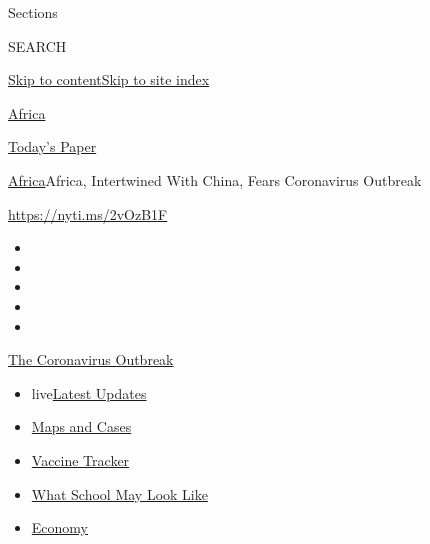 Sections

SEARCH

\protect\hyperlink{site-content}{Skip to
content}\protect\hyperlink{site-index}{Skip to site index}

\href{https://www.nytimes.com/section/world/africa}{Africa}

\href{https://myaccount.nytimes.com/auth/login?response_type=cookie\&client_id=vi}{}

\href{https://www.nytimes.com/section/todayspaper}{Today's Paper}

\href{/section/world/africa}{Africa}\textbar{}Africa, Intertwined With
China, Fears Coronavirus Outbreak

\url{https://nyti.ms/2vOzB1F}

\begin{itemize}
\item
\item
\item
\item
\item
\end{itemize}

\href{https://www.nytimes.com/news-event/coronavirus?action=click\&pgtype=Article\&state=default\&region=TOP_BANNER\&context=storylines_menu}{The
Coronavirus Outbreak}

\begin{itemize}
\tightlist
\item
  live\href{https://www.nytimes.com/2020/08/01/world/coronavirus-covid-19.html?action=click\&pgtype=Article\&state=default\&region=TOP_BANNER\&context=storylines_menu}{Latest
  Updates}
\item
  \href{https://www.nytimes.com/interactive/2020/us/coronavirus-us-cases.html?action=click\&pgtype=Article\&state=default\&region=TOP_BANNER\&context=storylines_menu}{Maps
  and Cases}
\item
  \href{https://www.nytimes.com/interactive/2020/science/coronavirus-vaccine-tracker.html?action=click\&pgtype=Article\&state=default\&region=TOP_BANNER\&context=storylines_menu}{Vaccine
  Tracker}
\item
  \href{https://www.nytimes.com/interactive/2020/07/29/us/schools-reopening-coronavirus.html?action=click\&pgtype=Article\&state=default\&region=TOP_BANNER\&context=storylines_menu}{What
  School May Look Like}
\item
  \href{https://www.nytimes.com/live/2020/07/31/business/stock-market-today-coronavirus?action=click\&pgtype=Article\&state=default\&region=TOP_BANNER\&context=storylines_menu}{Economy}
\end{itemize}

